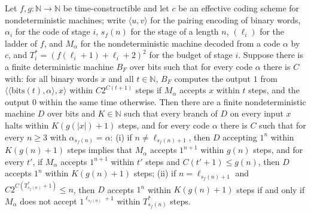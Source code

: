 \begin{theorem}
\label{Turing.NTimeDiag.exists_diagonalizer}
\leanok
{}
Let $f, g : \mathbb{N} \to \mathbb{N}$ be time-constructible and let $c$ be an effective coding scheme for nondeterministic machines; write $\langle u, v\rangle$ for the pairing encoding of binary words, $\alpha_i$ for the code of stage $i$, $s_f(n)$ for the stage of a length $n$, $(\ell_i)$ for the ladder of $f$, and $M_\alpha$ for the nondeterministic machine decoded from a code $\alpha$ by $c$, and $T^*_i = (f(\ell_i + 1) + \ell_i + 2)^2$ for the budget of stage $i$. Suppose there is a finite deterministic machine $B_F$ over bits such that for every code $\alpha$ there is $C$ with: for all binary words $x$ and all $t \in \mathbb{N}$, $B_F$ computes the output $1$ from $\langle\langle \mathrm{bits}(t), \alpha\rangle, x\rangle$ within $C 2^{C(t+1)}$ steps if $M_\alpha$ accepts $x$ within $t$ steps, and the output $0$ within the same time otherwise. Then there are a finite nondeterministic machine $D$ over bits and $K \in \mathbb{N}$ such that every branch of $D$ on every input $x$ halts within $K(g(|x|) + 1)$ steps, and for every code $\alpha$ there is $C$ such that for every $n \ge 3$ with $\alpha_{s_f(n)} = \alpha$: (i) if $n \ne \ell_{s_f(n)+1}$, then $D$ accepting $1^n$ within $K(g(n) + 1)$ steps implies that $M_\alpha$ accepts $1^{n+1}$ within $g(n)$ steps, and for every $t'$, if $M_\alpha$ accepts $1^{n+1}$ within $t'$ steps and $C(t' + 1) \le g(n)$, then $D$ accepts $1^n$ within $K(g(n) + 1)$ steps; (ii) if $n = \ell_{s_f(n)+1}$ and $C 2^{C(T^*_{s_f(n)} + 1)} \le n$, then $D$ accepts $1^n$ within $K(g(n) + 1)$ steps if and only if $M_\alpha$ does not accept $1^{\ell_{s_f(n)}+1}$ within $T^*_{s_f(n)}$ steps.
\end{theorem}
